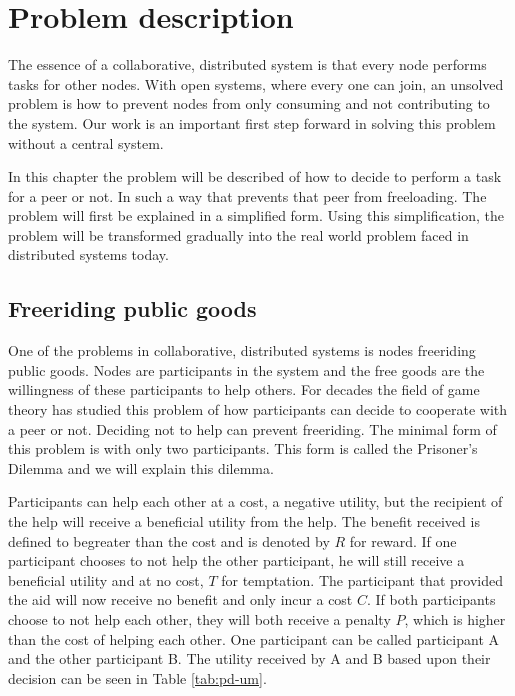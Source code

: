 \chapter{Problem description}
The essence of a collaborative, distributed system is that every node performs tasks for other nodes.
With open systems, where every one can join, an unsolved problem is how to prevent nodes
from only consuming and not contributing to the system.
Our work is an important first step forward in solving this problem without a central system.

In this chapter the problem will be described of how to decide to perform a task for a peer or not.
In such a way that prevents that peer from freeloading.
The problem will first be explained in a simplified form.
Using this simplification, the problem will be transformed gradually
into the real world problem faced in distributed systems today.

\section{Freeriding public goods}
One of the problems in collaborative, distributed systems is nodes freeriding public goods.
Nodes are participants in the system and the free goods are the willingness of these participants to help others.
For decades the field of game theory has studied this problem of how
participants can decide to cooperate with a peer or not\cite{Hardin-Tragedy}.
Deciding not to help can prevent freeriding.
The minimal form of this problem is with only two participants.
This form is called the Prisoner's Dilemma\cite{Nowak-PrisonerDilemma}\cite{Lai-Incentives}
and we will explain this dilemma.

Participants can help each other at a cost, a negative utility,
but the recipient of the help will receive a beneficial utility from the help.
The benefit received is defined to begreater
than the cost and is denoted by $R$ for reward.
If one participant chooses to not help the other participant,
he will still receive a beneficial utility and at no cost, $T$ for temptation.
The participant that provided the aid will now receive no benefit and only incur a cost $C$.
If both participants choose to not help each other,
they will both receive a penalty $P$, which is higher than the cost of helping each other.
One participant can be called participant A and the other participant B.
The utility received by A and B based upon their decision can be seen in Table \ref{tab:pd-um}.

